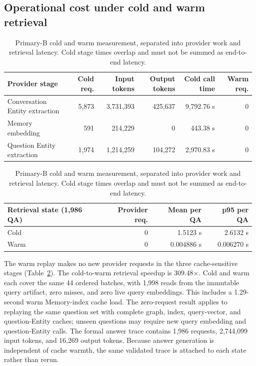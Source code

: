 \documentclass[10pt,twocolumn]{article}
\begin{document}
\subsection{Operational cost under cold and warm retrieval}

\begin{table}[t]
\centering
\caption{Primary-B cold and warm measurement, separated into provider work
and retrieval latency. Cold stage times overlap and must not be summed as
end-to-end latency.}
\label{tab:cost}
\begin{tabular}{@{}lrrrrr@{}}
\toprule
Provider stage & Cold req. & Input tokens & Output tokens & Cold call time & Warm req. \\
\midrule
Conversation Entity extraction & 5,873 & 3,731,393 & 425,637 & 9,792.76 s & 0 \\
Memory embedding & 591 & 214,229 & 0 & 443.38 s & 0 \\
Question Entity extraction & 1,974 & 1,214,259 & 104,272 & 2,970.83 s & 0 \\
\bottomrule
\end{tabular}

\vspace{0.45em}
\begin{tabular}{@{}lrrr@{}}
\toprule
Retrieval state (1,986 QA) & Provider req. & Mean per QA & p95 per QA \\
\midrule
Cold & 0 & 1.5123 s & 2.6132 s \\
Warm & 0 & 0.004886 s & 0.006270 s \\
\bottomrule
\end{tabular}
\end{table}

The warm replay makes no new provider requests in the three cache-sensitive
stages (Table~\ref{tab:cost}). The cold-to-warm retrieval speedup is 309.48$\times$.
Cold and warm each cover the same 44 ordered batches, with 1,998 reads from the
immutable query artifact, zero misses, and zero live query embeddings. This
includes a 1.29-second warm Memory-index cache load. The zero-request result
applies to replaying the same question set with complete
graph, index, query-vector, and question-Entity caches; unseen questions may
require new query embedding and question-Entity calls. The formal answer trace
contains 1,986 requests, 2,744,099 input tokens, and 16,269 output tokens.
Because answer generation is independent of cache warmth, the same validated
trace is attached to each state rather than rerun.
\end{document}
